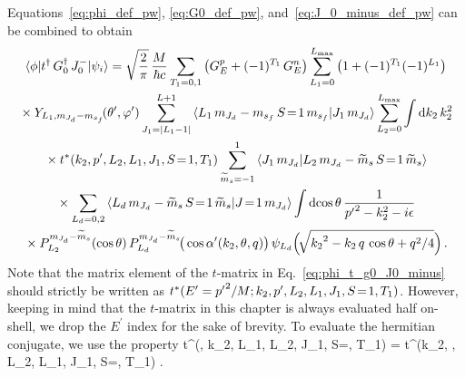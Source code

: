 	Equations~\eqref{eq:phi_def_pw}, \eqref{eq:G0_def_pw},
	and~\eqref{eq:J_0_minus_def_pw} can be combined to obtain
	\begin{multline}
	 \mbraket{\phi}{t^\dag \, \GreensFn^\dag \, J_0^-}{\psi_i}
	 = \sqrt{\frac{2}{\pi}} \,\frac{M}{\hbar c}
	 \sum_{T_1 = 0,1} \big(G_E ^p + (-1)^{T_1} \, G_E^n\big)
	 \sum_{L_1 = 0}^{L_{\rm max}} \big(1 + (-1)^{T_1} (-1)^{L_1}\big) \\
	 \null \times Y_{L_1 , \mJd - \msf}\!(\thetacm, \phicm)
	 \sum_{J_1 = |L_1 - 1|}^{L+1}
	 \CG{L_1}{\mJd - \msf}{S\!=\!1}{\msf}{J_1}{\mJd}
	 \sum_{L_2 = 0}^{L_{\rm max}} \int \dd k_2 \, k_2^2 \\
	 \null \times t^\ast(k_2, \pp, L_2, L_1, J_1, S\!=\!1, T_1)
	 \sum_{\widetilde{m}_s = -1}^1
	 \braket{J_1 \, \mJd}{L_2 \, \mJd - \wt{m}_s \, S\!=\!1 \, \wt{m}_s} \\
	 \null \times \sum_{L_d = 0,2}
	 \CG{L_d}{\mJd - \widetilde{m}_s}{S\!=\!1}{\widetilde{m}_s}{J\!=\!1}{\mJd}
	 \int \dcostheta
	 \, \frac{1}{{\pp}^2 - k_2^2 - i \epsilon} \\
	 \null \times
	 P_{L_2}^{\mJd - \widetilde{m}_s}(\cos\theta) \,
	 P_{L_d}^{\mJd - \widetilde{m}_s}\!\big(\cos\thetacprime(k_2, \theta, q)\big)
	 \, \psi_{L_d}\Big(\!\sqrt{{k_2}^2 - k_2 \, q \, \cos\theta + q^2/4}\Big) \,.
	\label{eq:phi_t_g0_J0_minus}
	\end{multline}
	Note that the matrix element of the $t$-matrix in
	Eq.~\eqref{eq:phi_t_g0_J0_minus} should strictly be written as
	${t^{\ast}}({E^\prime} = {p^\prime}^2/M; k_2, p^\prime, L_2, L_1, J_1, S\!=\!1, T_1)$.  However,
	keeping in mind that the $t$-matrix in this chapter is always evaluated
	half on-shell, we drop the $E^\prime$ index for the sake of brevity.
	To evaluate the hermitian conjugate, we use the property
	\beq
	t^\dag (\pp, k_2, L_1, L_2, J_1, S\!=, T_1)
	= t^\ast (k_2, \pp, L_2, L_1, J_1, S\!=, T_1) \;.
	\eeq

